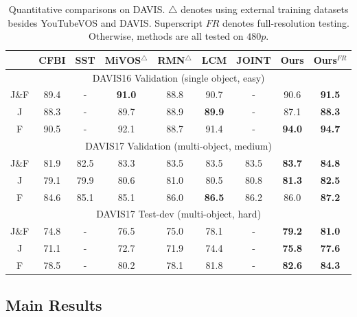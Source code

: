 \documentclass[letterpaper]{article} \usepackage{aaai22}  \usepackage{times}  \usepackage{helvet}  \usepackage{courier}  \usepackage[hyphens]{url}  \usepackage{graphicx} \urlstyle{rm} \def\UrlFont{\rm}  \usepackage{natbib}  \usepackage{caption} \DeclareCaptionStyle{ruled}{labelfont=normalfont,labelsep=colon,strut=off} \frenchspacing  \setlength{\pdfpagewidth}{8.5in}  \setlength{\pdfpageheight}{11in}  \usepackage{algorithm}
\begin{document}
 \begin{table}
	\centering
	\caption{Quantitative comparisons on DAVIS. $\bigtriangleup$ denotes using external training datasets besides YouTubeVOS and DAVIS. Superscript $FR$ denotes full-resolution testing. Otherwise, methods are all tested on $480p$. }
	\setlength{\tabcolsep}{1.0mm}
	\begin{small}
	\resizebox{0.48\textwidth}{!}
	{
    \begin{tabular}{c|ccccccc|c}
    \toprule
           & CFBI & SST & MiVOS${}^{\bigtriangleup}$ & RMN${}^{\bigtriangleup}$ & LCM  & JOINT & \textbf{Ours} & \textbf{Ours${}^{FR}$}\\ \midrule
         \multicolumn{9}{c}{DAVIS16 Validation (single object, easy)}                                    \\
		\midrule
        J$\&$F   & 89.4   & - & \textbf{91.0}      & 88.8& 90.7 & - & 90.6 & \textbf{91.5}  \\ 
        J     & 88.3    & - & {89.7} & 88.9 &\textbf{89.9} & - & 87.1 & \textbf{88.3}  \\ 
        F    & 90.5    & - & 92.1         & 88.7  &91.4& - &\textbf{94.0}& \textbf{94.7} \\ 
        \midrule
         \multicolumn{9}{c}{DAVIS17 Validation (multi-object, medium)}                                    \\
		\midrule
        J$\&$F   & 81.9   & 82.5 & 83.3 & 83.5 & 83.5 & 83.5 & \textbf{83.7} & \textbf{84.8}  \\ 
        J     & 79.1    & 79.9 & 80.6 & 81.0 & 80.5 & 80.8 & \textbf{81.3} & \textbf{82.5}  \\ 
        F    & 84.6    & 85.1 & 85.1 & 86.0 & \textbf{86.5} & 86.2 & {86.0} & \textbf{87.2} \\ 
        \midrule
         \multicolumn{9}{c}{DAVIS17 Test-dev (multi-object, hard)}                                    \\
		\midrule
        J$\&$F   & 74.8     & -  & 76.5 & 75.0  & 78.1 & - & \textbf{79.2} & \textbf{81.0} \\ 
        J     & 71.1     & - & 72.7  & 71.9 & 74.4 & - & \textbf{75.8}  &  \textbf{77.6}\\ 
        F     & 78.5    & - & 80.2  & 78.1 & 81.8 & - & \textbf{82.6}  & \textbf{84.3}\\         
        
        \bottomrule
    \end{tabular}
    }
    \end{small}
    \label{table:dv}
\end{table} \subsection{Main Results}
\end{document}
